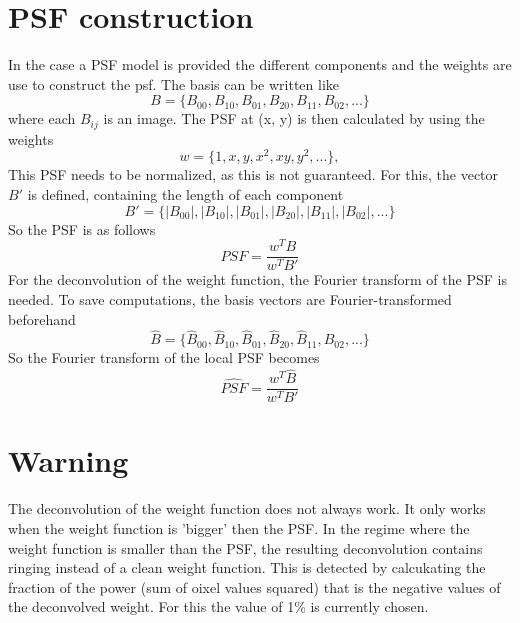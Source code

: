 \section{PSF construction}
In the case a PSF model is provided the different components and the weights are use to construct the psf. The basis can be written like
\begin{equation}
    B = \{B_{00}, B_{10}, B_{01}, B_{20}, B_{11}, B_{02}, ...\}
\end{equation}
where each $B_{ij}$ is an image.
The PSF at (x, y) is then calculated by using the weights
\begin{equation}
    w = \{1, x, y, x^2, xy, y^2,...\},
\end{equation}
This PSF needs to be normalized, as this is not guaranteed. For this, the vector $B'$ is defined, containing the length of each component
\begin{equation}
    B' = \{|B_{00}|, |B_{10}|, |B_{01}|, |B_{20}|, |B_{11}|, |B_{02}|, ...\}
\end{equation}
So the PSF is as follows
\begin{equation}
    PSF = \frac{w^TB}{w^TB'}
\end{equation}
For the deconvolution of the weight function, the Fourier transform of the PSF is needed. To save computations, the basis vectors are Fourier-transformed beforehand
\begin{equation}
    \hat{B} = \{\hat{B}_{00}, \hat{B}_{10}, \hat{B}_{01}, \hat{B}_{20}, \hat{B}_{11}, \hat{B}_{02}, ...\}
\end{equation}
So the Fourier transform of the local PSF becomes
\begin{equation}
    \hat{PSF} = \frac{w^T\hat{B}}{w^TB'}
\end{equation}
\section{Warning}
The deconvolution of the weight function does not always work. It only works when the weight function is 'bigger' then the PSF. In the regime where the weight function is smaller than the PSF, the resulting deconvolution contains ringing instead of a clean weight function. This is detected by calcukating the fraction of the power (sum of oixel values squared) that is the negative values of the deconvolved weight. For this the value of 1\% is currently chosen. 
\newpage
